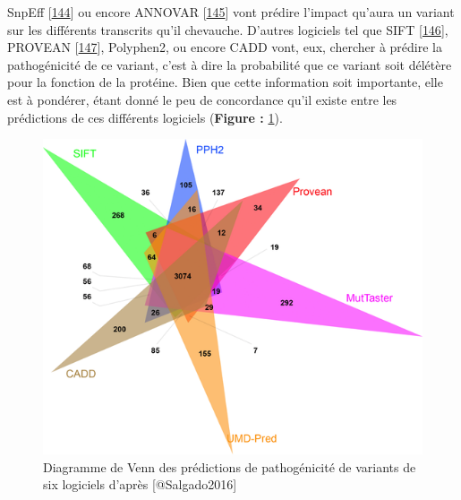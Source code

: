 \documentclass[12pt,twoside]{reedthesis}
\theoremstyle{definition}
\theoremstyle{definition}
\theoremstyle{remark}
\begin{document}
\begin{enumerate}
\begin{enumerate}
      SnpEff {[}\protect\hyperlink{ref-Cingolani2012}{144}{]} ou encore
      ANNOVAR {[}\protect\hyperlink{ref-Wang2010}{145}{]} vont prédire
      l'impact qu'aura un variant sur les différents transcrits qu'il
      chevauche. D'autres logiciels tel que SIFT
      {[}\protect\hyperlink{ref-Kumar2009}{146}{]}, PROVEAN
      {[}\protect\hyperlink{ref-Choi2012}{147}{]}, Polyphen2, ou encore
      CADD vont, eux, chercher à prédire la pathogénicité de ce variant,
      c'est à dire la probabilité que ce variant soit délétère pour la
      fonction de la protéine. Bien que cette information soit importante,
      elle est à pondérer, étant donné le peu de concordance qu'il existe
      entre les prédictions de ces différents logiciels (\textbf{Figure :}
      \ref{fig:vennpred}).
    \end{enumerate}
  \end{enumerate}
  
  \begin{figure}
  
  {\centering \includegraphics[scale=.7]{figure/venn_Diag_patho_pred} 
  
  }
  
  \caption[Diagramme de Venn des prédictions de pathogénicité de variants de six logiciels]{Diagramme de Venn des prédictions de pathogénicité de variants de six logiciels d'après [@Salgado2016]}\label{fig:vennpred}
  \end{figure}
  
  \newpage
  
\end{document}
